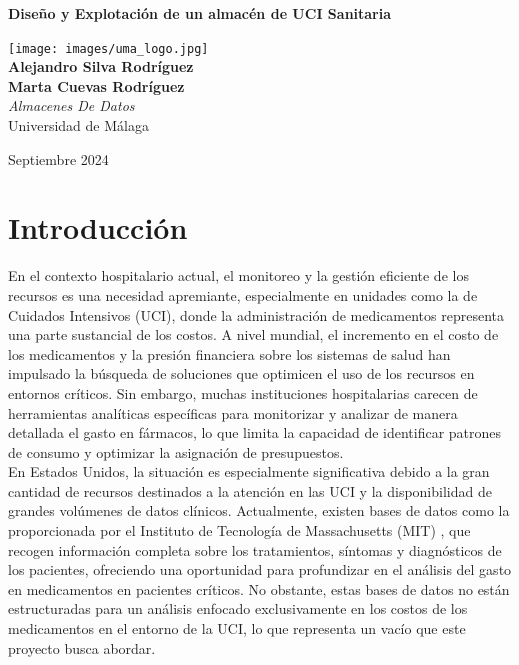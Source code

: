 \documentclass{article}
\begin{document}
\begin{titlepage}
	\centering
	\vspace*{3cm}
	
	{\Huge \textbf{Diseño y Explotación de un almacén de 
			UCI Sanitaria}\\[0.5cm]}
	
	\vspace{2cm}
	\texttt{[image: images/uma\_logo.jpg]}\\[1cm]
	
	{\LARGE \textbf{Alejandro Silva Rodríguez}\\[0.5cm]}
	{\LARGE \textbf{Marta Cuevas Rodríguez}\\[0.5cm]}
	{\large \textit{Almacenes De Datos}\\
		Universidad de Málaga\\
		}
	
	\vfill
	
	{\large Septiembre 2024}
\end{titlepage}

\tableofcontents

\newpage
\section{Introducción}
\label{sec:introduccion}

En el contexto hospitalario actual, el monitoreo y la gestión eficiente de los recursos es una necesidad apremiante, especialmente en unidades como la de Cuidados Intensivos (UCI), donde la administración de medicamentos representa una parte sustancial de los costos. A nivel mundial, el incremento en el costo de los medicamentos y la presión financiera sobre los sistemas de salud han impulsado la búsqueda de soluciones que optimicen el uso de los recursos en entornos críticos. Sin embargo, muchas instituciones hospitalarias carecen de herramientas analíticas específicas para monitorizar y analizar de manera detallada el gasto en fármacos, lo que limita la capacidad de identificar patrones de consumo y optimizar la asignación de presupuestos.\\

En Estados Unidos, la situación es especialmente significativa debido a la gran cantidad de recursos destinados a la atención en las UCI y la disponibilidad de grandes volúmenes de datos clínicos. Actualmente, existen bases de datos como la proporcionada por el Instituto de Tecnología de Massachusetts (MIT) \cite{eicu_crd}, que recogen información completa sobre los tratamientos, síntomas y diagnósticos de los pacientes, ofreciendo una oportunidad para profundizar en el análisis del gasto en medicamentos en pacientes críticos. No obstante, estas bases de datos no están estructuradas para un análisis enfocado exclusivamente en los costos de los medicamentos en el entorno de la UCI, lo que representa un vacío que este proyecto busca abordar.
\end{document}
